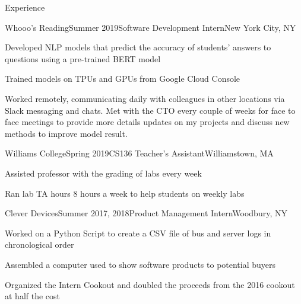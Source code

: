 \documentclass{resume} %
\begin{document}
\begin{rSection}{Experience}

\begin{rSubsection}{Whooo’s Reading}{Summer 2019}{Software Development Intern}{New York City, NY}
\item Developed NLP models that predict the accuracy of students’ answers to questions using a pre-trained BERT model
\item Trained models on TPUs and GPUs from Google Cloud Console
\item Worked remotely, communicating daily with colleagues in other locations via Slack messaging and chats. Met with the CTO every
couple of weeks for face to face meetings to provide more details updates on my projects and discuss new methods to improve model
result.
\end{rSubsection}


\begin{rSubsection}{Williams College}{Spring 2019}{CS136 Teacher's Assistant}{Williamstown, MA}
\item Assisted professor with the grading of labs every week
\item Ran lab TA hours 8 hours a week to help students on weekly labs
\end{rSubsection}


\begin{rSubsection}{Clever Devices}{Summer 2017, 2018}{Product Management Intern}{Woodbury, NY}
\item Worked on a Python Script to create a CSV file of bus and server logs in chronological order
\item Assembled a computer used to show software products to potential buyers
\item Organized the Intern Cookout and doubled the proceeds from the 2016 cookout at half the cost
\end{rSubsection}


\end{rSection}
\end{document}
